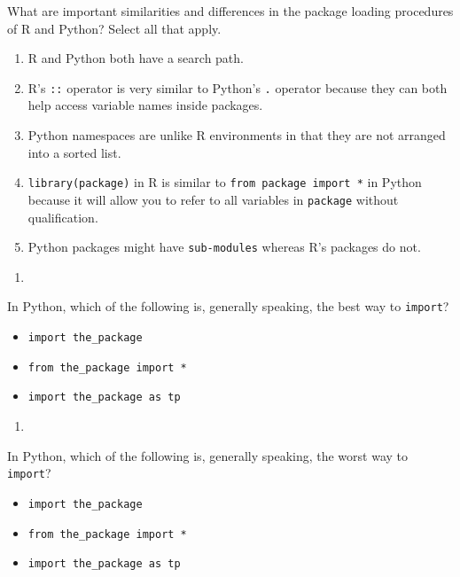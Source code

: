 \documentclass[
  12pt,
  krantz2]{krantz}
\providecommand{\tightlist}{%
  \setlength{\itemsep}{0pt}\setlength{\parskip}{0pt}}
\begin{document}
What are important similarities and differences in the package loading procedures of R and Python? Select all that apply.

\begin{enumerate}
\def\labelenumi{\alph{enumi})}
\tightlist
\item
  R and Python both have a search path.
\item
  R's \texttt{::} operator is very similar to Python's \texttt{.} operator because they can both help access variable names inside packages.
\item
  Python namespaces are unlike R environments in that they are not arranged into a sorted list.
\item
  \texttt{library(package)} in R is similar to \texttt{from\ package\ import\ *} in Python because it will allow you to refer to all variables in \texttt{package} without qualification.
\item
  Python packages might have \texttt{sub-modules} whereas R's packages do not.
\end{enumerate}

\begin{enumerate}
\def\labelenumi{\arabic{enumi}.}
\setcounter{enumi}{2}
\tightlist
\item
\end{enumerate}

In Python, which of the following is, generally speaking, the best way to \texttt{import}?

\begin{itemize}
\tightlist
\item
  \texttt{import\ the\_package}
\item
  \texttt{from\ the\_package\ import\ *}
\item
  \texttt{import\ the\_package\ as\ tp}
\end{itemize}

\begin{enumerate}
\def\labelenumi{\arabic{enumi}.}
\setcounter{enumi}{3}
\tightlist
\item
\end{enumerate}

In Python, which of the following is, generally speaking, the worst way to \texttt{import}?

\begin{itemize}
\tightlist
\item
  \texttt{import\ the\_package}
\item
  \texttt{from\ the\_package\ import\ *}
\item
  \texttt{import\ the\_package\ as\ tp}
\end{itemize}
\end{document}
